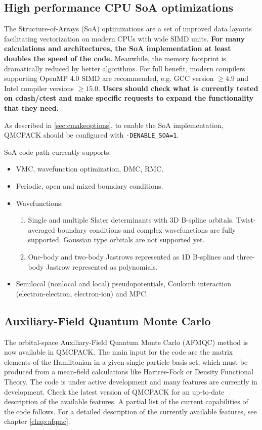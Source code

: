 \subsection{High performance CPU SoA optimizations}
The Structure-of-Arrays (SoA) optimizations \cite{IPCC_SC17} are a set
of improved data layouts facilitating vectorization on modern CPUs
with wide SIMD units. \textbf{For many calculations and architectures, the SoA
  implementation at least doubles the speed of the code.}  Meanwhile,
the memory footprint is dramatically reduced by better algorithms. For full benefit, modern
compilers supporting OpenMP 4.0 SIMD are recommended, e.g. GCC version
$\ge$4.9 and Intel compiler versions $\ge 15.0$. \textbf{Users should
  check what is currently tested on cdash/ctest and make specific
  requests to expand the functionality that they need.}

As described in \ref{sec:cmakeoptions}, to enable the SoA
implementation, QMCPACK should be configured with \texttt{-DENABLE\_SOA=1}.

SoA code path currently supports:
\begin{itemize}
  \item VMC, wavefunction optimization, DMC, RMC.
  \item Periodic, open and mixed boundary conditions.
  \item Wavefunctions:
    \begin{enumerate}
      \item Single and multiple Slater determinants with 3D B-spline
        orbitals. Twist-averaged boundary conditions and complex
        wavefunctions are fully supported. Gaussian type orbitals are
        not supported yet.
      \item One-body and two-body Jastrows represented as 1D B-splines and three-body Jastrow represented as polynomials.
    \end{enumerate}
  \item Semilocal (nonlocal and local) pseudopotentials, Coulomb interaction (electron-electron, electron-ion) and MPC.
\end{itemize}

\subsection{Auxiliary-Field Quantum Monte Carlo}

The orbital-space Auxiliary-Field Quantum Monte Carlo (AFMQC) method is now available in QMCPACK. The main input for the code are the matrix elements of the Hamiltonian in a given single particle basis set, which must be produced from a mean-field calculations like Hartree-Fock or Density Functional Theory. The code is under active development and many features are currently in development. Check the latest version of QMCPACK for an up-to-date description of the available features. A partial list of the current capabilities of the code follows. For a detailed description of the currently available features, see chapter \ref{chap:afqmc}.
 
